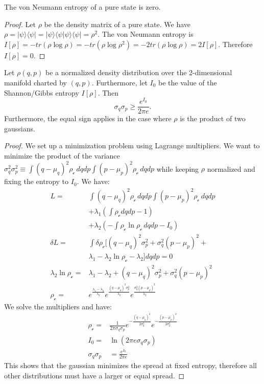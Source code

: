 \documentclass[10pt,twocolumn, nofootinbib]{revtex4-2}
\begin{document}
\begin{prop}
	The von Neumann entropy of a pure state is zero.
\end{prop}

\begin{proof}
	Let $\rho$ be the density matrix of a pure state. We have $\rho = |\psi \rangle \langle \psi | = |\psi \rangle \langle \psi |\psi \rangle \langle \psi | = \rho^2$. The von Neumann entropy is $I[\rho] = - tr (\rho \log \rho) = - tr (\rho \log \rho^2) = - 2 tr (\rho \log \rho) = 2 I[\rho]$. Therefore $I[\rho] = 0$.
\end{proof}

\begin{prop}
	Let $\rho(q,p)$ be a normalized density distribution over the 2-dimensional manifold charted by $(q,p)$. Furthermore, let $I_0$ be the value of the Shannon/Gibbs entropy $I[\rho]$. Then
	$$ 	\sigma_q \sigma_p \geq \frac{e^{I_0}}{2 \pi e}.$$
	Furthermore, the equal sign applies in the case where $\rho$ is the product of two gaussians.
\end{prop}

\begin{proof}
	We set up a minimization problem using Lagrange multipliers. We want to minimize the product of the variance $\sigma_q^2 \sigma_p^2 \equiv \int (q-\mu_q)^2 \rho_{\mathcal{c}} \, dqdp \int (p-\mu_p)^2 \rho_{\mathcal{c}} \, dqdp$ while keeping $\rho$ normalized and fixing the entropy to $I_0$. We have: 
	\begin{align*}
		L = &\int (q-\mu_q)^2 \rho_{\mathcal{c}} \, dqdp \int (p-\mu_p)^2 \rho_{\mathcal{c}} \, dqdp \\
		&+ \lambda_1(\int \rho_{\mathcal{c}} dqdp - 1) \\ &+ \lambda_2(- \int \rho_{\mathcal{c}} \ln \rho_{\mathcal{c}} \, dqdp - I_0)\\
		\delta L = &\int \delta \rho_{\mathcal{c}} [(q-\mu_q)^2 \sigma_p^2 + \sigma_q^2 (p-\mu_p)^2 + \\ &\lambda_1 - \lambda_2 \ln \rho_{\mathcal{c}} - \lambda_2 ] dqdp = 0 \\
		\lambda_2 \ln \rho_{\mathcal{c}} = &\lambda_1 - \lambda_2 + (q-\mu_q)^2 \sigma_p^2 + \sigma_q^2 (p-\mu_p)^2 \\
		\rho_{\mathcal{c}} = &e^{\frac{\lambda_1 - \lambda_2}{\lambda_2}}e^{\frac{(q-\mu_q)^2 \sigma_p^2}{\lambda_2}}e^{\frac{\sigma_q^2 (p-\mu_p)^2}{\lambda_2}}
	\end{align*}
	We solve the multipliers and have:
	\begin{align*}
		\rho_{\mathcal{c}} = &\frac{1}{ 2 \pi \sigma_q \sigma_p} e^{-\frac{(q-\mu_q)^2}{2\sigma_q^2}} e^{-\frac{(p-\mu_p)^2}{2\sigma_p^2}} \\
		I_0 = &\ln (2\pi e\sigma_q\sigma_p) \\
		\sigma_q \sigma_p &= \frac{e^{I_0}}{2 \pi e}
	\end{align*}
	This shows that the gaussian minimizes the spread at fixed entropy, therefore all other distributions must have a larger or equal spread. 
\end{proof}
\end{document}
